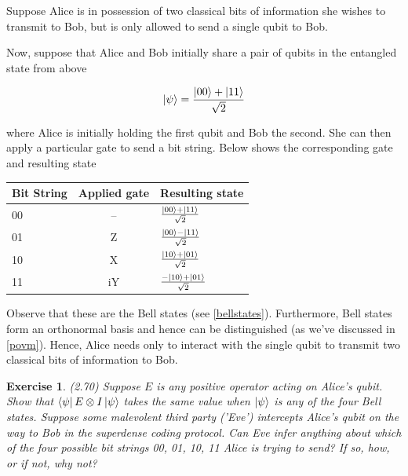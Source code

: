 \documentclass[11pt]{article}
\newcommand\0{\mathbf{0}}
\newcommand\<{\langle}
\renewcommand\>{\rangle}
\newtheorem{exercise}[theorem]{Exercise}
\begin{document}
Suppose Alice is in possession of two classical bits of information she wishes to transmit to Bob, but is only allowed to send a single qubit to Bob.

 Now, suppose that Alice and Bob initially share a pair of qubits in the entangled state from above
 
\begin{align*}
\ket{\psi} = \frac{\ket{00} + \ket{11}}{\sqrt{2}}	
\end{align*}
 
 where Alice is initially holding the first qubit and Bob the second. She can then apply a particular gate to send a bit string. Below shows the corresponding gate and resulting state
 
 \begin{table}[H]
 	\begin{center}
 \begin{tabular}{l | c | l }
 	Bit String & Applied gate  & Resulting state\\
 	\hline 
 	00 & -- & $\frac{\ket{00} + \ket{11}}{\sqrt{2}}$\\
 	01 & Z & $\frac{\ket{00} - \ket{11}}{\sqrt{2}}$\\
 	10 & X & $\frac{\ket{10} + \ket{01}}{\sqrt{2}}$\\
 	11 & iY & $\frac{-\ket{10} + \ket{01}}{\sqrt{2}}$
 \end{tabular}
 \end{center}
 \end{table}

Observe that these are the Bell states (see \ref{bellstates}). Furthermore, Bell states form an orthonormal basis and hence can be distinguished (as we've discussed in \ref{povm}). Hence, Alice needs only to interact with the single qubit to transmit two classical bits of information to Bob.

\begin{exercise} 
(2.70) Suppose $E$ is any positive operator acting on Alice’s qubit. Show that $\bra{\psi} E \otimes I \ket{\psi}$ takes the same value when $\ket{\psi}$ is any of the four Bell states. Suppose some malevolent third party ('Eve') intercepts Alice’s qubit on the way to Bob in the superdense coding protocol. Can Eve infer anything about which of the four possible bit strings 00, 01, 10, 11 Alice is trying to send? If so, how, or if not, why not?	
\end{exercise}
\end{document}
